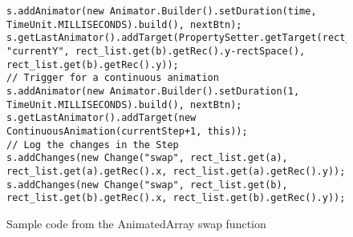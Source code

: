\begin{figure}
\begin{center}
\begin{verbatim}
s.addAnimator(new Animator.Builder().setDuration(time, TimeUnit.MILLISECONDS).build(), nextBtn);
s.getLastAnimator().addTarget(PropertySetter.getTarget(rect_list.get(b), "currentY", rect_list.get(b).getRec().y-rectSpace(), rect_list.get(b).getRec().y));
// Trigger for a continuous animation
s.addAnimator(new Animator.Builder().setDuration(1, TimeUnit.MILLISECONDS).build(), nextBtn);
s.getLastAnimator().addTarget(new ContinuousAnimation(currentStep+1, this));
// Log the changes in the Step
s.addChanges(new Change("swap", rect_list.get(a), rect_list.get(a).getRec().x, rect_list.get(a).getRec().y));
s.addChanges(new Change("swap", rect_list.get(b), rect_list.get(b).getRec().x, rect_list.get(b).getRec().y));
\end{verbatim}
\end{center}
\caption{Sample code from the AnimatedArray swap function}
\label{fig:swap}
\end{figure}